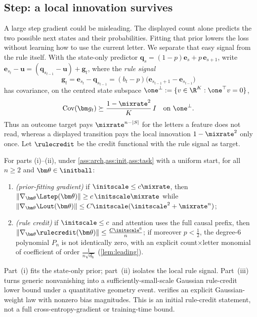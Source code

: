 \subsection{Step: a local innovation survives}
A large step gradient could be misleading. The displayed count alone predicts the two possible next states and their probabilities.
Fitting that prior lowers the loss without learning how to use the current letter. We separate that easy signal from the rule itself. With the
state-only predictor $\bm q_s=(1-p)\bm e_s+p\,\bm e_{s+1}$, write $\bm e_{s_t}-\bm u=(\bm q_{s_{t-1}}-\bm u)+\bm g_t$, where the
\emph{rule signal}
\[
 \bm g_t=\bm e_{s_t}-\bm q_{s_{t-1}}=(b_t-p)\bigl(\bm e_{s_{t-1}+1}-\bm e_{s_{t-1}}\bigr)
\]
has covariance, on the centred state subspace $\one^\perp:=\{v\in\R^K:\one^\top v=0\}$,
\begin{equation}
 \operatorname{Cov}(\bm g_t)\succeq\frac{1-\mixrate^2}{K}\,I
 \quad\text{on }\one^\perp.
 \label{eq:local-variation}
\end{equation}
Thus an outcome target pays $\mixrate^{n-|S|}$ for the letters a feature does not read, whereas a displayed transition pays the
local innovation $1-\mixrate^2$ only once. Let $\rulecredit$ be the credit
functional with the rule signal as target.

\begin{theorem}
\label{thm:separation}
For parts (i)--(ii), under \cref{ass:arch,ass:init,ass:task} with a uniform start,
for all $n\ge2$ and $\bm\theta\in\initball$:
\begin{enumerate}[label=(\roman*),leftmargin=*,itemsep=0pt,topsep=2pt]
\item \emph{(prior-fitting gradient)} if $\initscale\le c\mixrate$, then $\|\nabla_{\bm\theta}\Lstep(\bm\theta)\|\ge c\,\initscale\mixrate$ while
$\|\nabla_{\bm\theta}\Lout(\bm\theta)\|\le C\initscale(\initscale^2+\mixrate^n)$;
\item \emph{(rule credit)} if $\initscale\le c$ and attention uses the full causal prefix, then $\|\nabla_{\bm\theta}\rulecredit(\bm\theta)\|\le \frac{C\initscale^6}{n}$; if
moreover $p<\tfrac{1}{2}$, the degree-$6$ polynomial $P_n$ is not identically zero, with an explicit count$\times$letter monomial of
coefficient of order $\frac{1}{n\sqrt{d_{\mathrm h}}}$
(\cref{lem:leading}).

\end{enumerate}
\end{theorem}

Part~(i) fits the state-only prior; part~(ii) isolates the local rule signal.
Part~(iii) turns generic nonvanishing into a sufficiently-small-scale Gaussian rule-credit
lower bound under a quantitative geometry event. 
verifies an explicit Gaussian-weight law with nonzero bias magnitudes. This is an initial
rule-credit statement, not a full cross-entropy-gradient or training-time bound.

